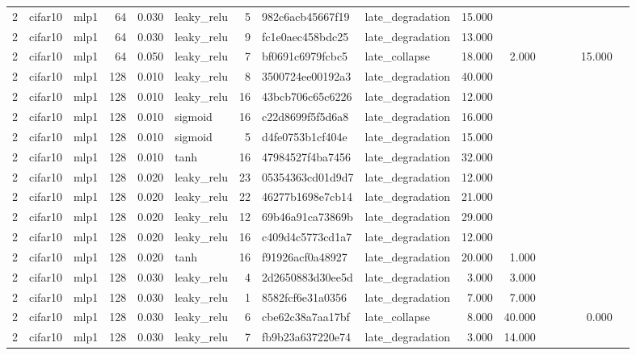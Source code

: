 \begin{table}[htbp]
{\begin{tabular}{@{}rllrrlrllrrrrrrr@{}}
2 & cifar10 & mlp1 & 64 & 0.030 & leaky\_relu & 5 & 982c6acb45667f19 & late\_degradation & 15.000 &  &  &  &  &  &  \\
2 & cifar10 & mlp1 & 64 & 0.030 & leaky\_relu & 9 & fc1e0aec458bdc25 & late\_degradation & 13.000 &  &  &  &  &  &  \\
2 & cifar10 & mlp1 & 64 & 0.050 & leaky\_relu & 7 & bf0691c6979fcbc5 & late\_collapse & 18.000 & 2.000 &  &  &  & 15.000 &  \\
2 & cifar10 & mlp1 & 128 & 0.010 & leaky\_relu & 8 & 3500724ee00192a3 & late\_degradation & 40.000 &  &  &  &  &  &  \\
2 & cifar10 & mlp1 & 128 & 0.010 & leaky\_relu & 16 & 43bcb706c65c6226 & late\_degradation & 12.000 &  &  &  &  &  &  \\
2 & cifar10 & mlp1 & 128 & 0.010 & sigmoid & 16 & c22d8699f5f5d6a8 & late\_degradation & 16.000 &  &  &  &  &  &  \\
2 & cifar10 & mlp1 & 128 & 0.010 & sigmoid & 5 & d4fe0753b1cf404e & late\_degradation & 15.000 &  &  &  &  &  &  \\
2 & cifar10 & mlp1 & 128 & 0.010 & tanh & 16 & 47984527f4ba7456 & late\_degradation & 32.000 &  &  &  &  &  &  \\
2 & cifar10 & mlp1 & 128 & 0.020 & leaky\_relu & 23 & 05354363cd01d9d7 & late\_degradation & 12.000 &  &  &  &  &  &  \\
2 & cifar10 & mlp1 & 128 & 0.020 & leaky\_relu & 22 & 46277b1698e7cb14 & late\_degradation & 21.000 &  &  &  &  &  &  \\
2 & cifar10 & mlp1 & 128 & 0.020 & leaky\_relu & 12 & 69b46a91ca73869b & late\_degradation & 29.000 &  &  &  &  &  &  \\
2 & cifar10 & mlp1 & 128 & 0.020 & leaky\_relu & 16 & c409d4c5773cd1a7 & late\_degradation & 12.000 &  &  &  &  &  &  \\
2 & cifar10 & mlp1 & 128 & 0.020 & tanh & 16 & f91926acf0a48927 & late\_degradation & 20.000 & 1.000 &  &  &  &  &  \\
2 & cifar10 & mlp1 & 128 & 0.030 & leaky\_relu & 4 & 2d2650883d30ee5d & late\_degradation & 3.000 & 3.000 &  &  &  &  &  \\
2 & cifar10 & mlp1 & 128 & 0.030 & leaky\_relu & 1 & 8582fcf6e31a0356 & late\_degradation & 7.000 & 7.000 &  &  &  &  &  \\
2 & cifar10 & mlp1 & 128 & 0.030 & leaky\_relu & 6 & cbe62c38a7aa17bf & late\_collapse & 8.000 & 40.000 &  &  &  & 0.000 &  \\
2 & cifar10 & mlp1 & 128 & 0.030 & leaky\_relu & 7 & fb9b23a637220e74 & late\_degradation & 3.000 & 14.000 &  &  &  &  &  \\

\end{tabular}}
\end{table}
